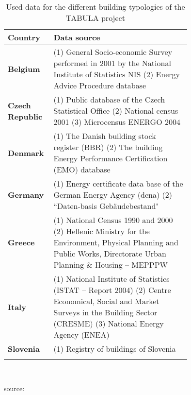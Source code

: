 \begin{table}[htbp] 
  \centering
\caption[Used data for the different building typologies of the TABULA project]{
  Used data for the different building typologies of the TABULA
  project
  }\label{tab:TABULA}%
    \begin{tabular}{l p{0.75\linewidth}}
    \toprule
    \addlinespace
\textbf{Country} & Data source\\
	\midrule
    \addlinespace
\textbf{Belgium} &
  (1) General Socio-economic Survey performed in 2001 by the
	      National Institute of Statistics NIS
  (2) Energy Advice Procedure database
  \\
\textbf{Czech Republic}&
  (1) Public database of the Czech Statistical Office
  (2) National census 2001
  (3) Microcensus ENERGO 2004
  \\
\textbf{Denmark}&
  (1) The Danish building stock register (BBR)
  (2) The building Energy Performance Certification (EMO) database
  \\
\textbf{Germany}&
  (1) Energy certificate data base of the German Energy Agency (dena)
  (2)  ``Daten-basis Gebäudebestand"~\cite{Diefenbach.2010}
  \\
\textbf{Greece}&
  (1) National Census 1990 and 2000
  (2) Hellenic Ministry for the Environment, Physical Planning and Public
		  Works, Directorate Urban Planning \& Housing -- MEPPPW
          \\
\textbf{Italy}&	
  (1) National Institute of Statistics (ISTAT -- Report 2004)
  (2) Centre Economical, Social and Market Surveys in the Building Sector
  (CRESME)
  (3) National Energy Agency (ENEA)\\
\textbf{Slovenia}&
  (1) Registry of buildings of Slovenia
      \\
	\addlinespace
	\bottomrule
    \end{tabular}\\
\begin{footnotesize}
    source:~\cite{TABULAProjectTeam.2012c}
\end{footnotesize}
\end{table}%